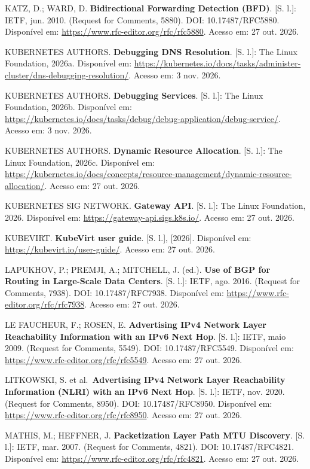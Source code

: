 \documentclass[12pt,openany,oneside,a4paper,chapter=TITLE,english,brazil]{abntex2}
\newenvironment{referenciasabnt}
  {\begin{flushleft}\SingleSpacing\setlength{\parindent}{0pt}\setlength{\parskip}{\baselineskip}}
  {\end{flushleft}}
\begin{document}
\begin{referenciasabnt}
KATZ, D.; WARD, D. \textbf{Bidirectional Forwarding Detection (BFD)}. {[}S. l.{]}: IETF, jun. 2010. (Request for Comments, 5880). DOI: 10.17487/RFC5880. Disponível em: \url{https://www.rfc-editor.org/rfc/rfc5880}. Acesso em: 27 out. 2026.

KUBERNETES AUTHORS. \textbf{Debugging DNS Resolution}. {[}S. l.{]}: The Linux Foundation, 2026a. Disponível em: \url{https://kubernetes.io/docs/tasks/administer-cluster/dns-debugging-resolution/}. Acesso em: 3 nov. 2026.

KUBERNETES AUTHORS. \textbf{Debugging Services}. {[}S. l.{]}: The Linux Foundation, 2026b. Disponível em: \url{https://kubernetes.io/docs/tasks/debug/debug-application/debug-service/}. Acesso em: 3 nov. 2026.

KUBERNETES AUTHORS. \textbf{Dynamic Resource Allocation}. {[}S. l.{]}: The Linux Foundation, 2026c. Disponível em: \url{https://kubernetes.io/docs/concepts/resource-management/dynamic-resource-allocation/}. Acesso em: 27 out. 2026.

KUBERNETES SIG NETWORK. \textbf{Gateway API}. {[}S. l.{]}: The Linux Foundation, 2026. Disponível em: \url{https://gateway-api.sigs.k8s.io/}. Acesso em: 27 out. 2026.

KUBEVIRT. \textbf{KubeVirt user guide}. {[}S. l.{]}, {[}2026{]}. Disponível em: \url{https://kubevirt.io/user-guide/}. Acesso em: 27 out. 2026.

LAPUKHOV, P.; PREMJI, A.; MITCHELL, J. (ed.). \textbf{Use of BGP for Routing in Large-Scale Data Centers}. {[}S. l.{]}: IETF, ago. 2016. (Request for Comments, 7938). DOI: 10.17487/RFC7938. Disponível em: \url{https://www.rfc-editor.org/rfc/rfc7938}. Acesso em: 27 out. 2026.

LE FAUCHEUR, F.; ROSEN, E. \textbf{Advertising IPv4 Network Layer Reachability Information with an IPv6 Next Hop}. {[}S. l.{]}: IETF, maio 2009. (Request for Comments, 5549). DOI: 10.17487/RFC5549. Disponível em: \url{https://www.rfc-editor.org/rfc/rfc5549}. Acesso em: 27 out. 2026.

LITKOWSKI, S. et al.~\textbf{Advertising IPv4 Network Layer Reachability Information (NLRI) with an IPv6 Next Hop}. {[}S. l.{]}: IETF, nov. 2020. (Request for Comments, 8950). DOI: 10.17487/RFC8950. Disponível em: \url{https://www.rfc-editor.org/rfc/rfc8950}. Acesso em: 27 out. 2026.

MATHIS, M.; HEFFNER, J. \textbf{Packetization Layer Path MTU Discovery}. {[}S. l.{]}: IETF, mar. 2007. (Request for Comments, 4821). DOI: 10.17487/RFC4821. Disponível em: \url{https://www.rfc-editor.org/rfc/rfc4821}. Acesso em: 27 out. 2026.


\end{referenciasabnt}
\end{document}

